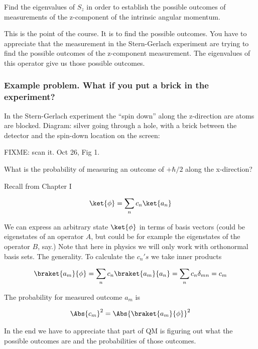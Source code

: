 Find the eigenvalues of $S_z$ in order to establish the possible outcomes of measurements of the z-component of the intrinsic angular momentum.

This is the point of the course.  It is to find the possible outcomes.  You have to appreciate that the measurement in the Stern-Gerlach experiment are trying to find the possible outcomes of the z-component measurement.  The eigenvalues of this operator give us those possible outcomes.

\subsubsection{Example problem.  What if you put a brick in the experiment?}

In the Stern-Gerlach experiment the ``spin down'' along the z-direction are atoms are blocked.  Diagram: silver going through a hole, with a brick between the detector and the spin-down location on the screen:

FIXME: scan it.  Oct 26, Fig 1.

What is the probability of measuring an outcome of $+\hbar/2$ along the x-direction?

Recall from Chapter I

\begin{align}\label{eqn:PHY356Foct26:103}
\ket{\phi} = \sum_n c_n \ket{a_n}
\end{align}

We can express an arbitrary state $\ket{\phi}$ in terms of basis vectors (could be eigenstates of an operator $A$, but could be for example the eigenstates of the operator $B$, say.)  Note that here in physics we will only work with orthonormal basis sets.  The generality.  To calculate the $c_n's$ we take inner products

\begin{align}\label{eqn:PHY356Foct26:104}
\braket{a_m}{\phi} = \sum_n c_n \braket{a_m}{a_n} = \sum_n c_n \delta_{mn} = c_m
\end{align}

The probability for measured outcome $a_m$ is

\begin{align}\label{eqn:PHY356Foct26:105}
\Abs{c_m}^2 = \Abs{ \braket{a_m}{\phi} }^2
\end{align}

In the end we have to appreciate that part of QM is figuring out what the possible outcomes are and the probabilities of those outcomes.

